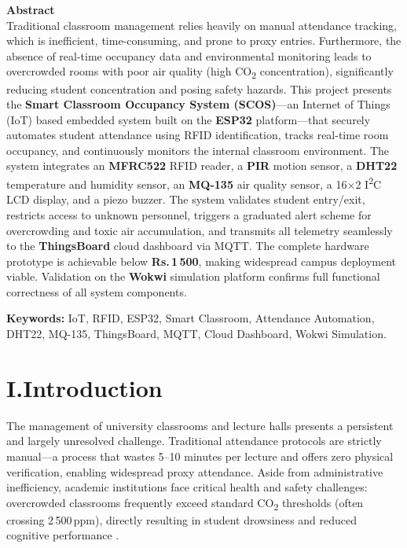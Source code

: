 \documentclass[12pt,a4paper]{article}
\begin{document}
\begin{mdframed}[linecolor=gray!60, backgroundcolor=gray!4]
\textbf{\large Abstract}\\[6pt]
Traditional classroom management relies heavily on manual attendance tracking, which is
inefficient, time-consuming, and prone to proxy entries. Furthermore, the absence of
real-time occupancy data and environmental monitoring leads to overcrowded rooms with
poor air quality (high CO\textsubscript{2} concentration), significantly reducing student concentration
and posing safety hazards. This project presents the \textbf{Smart Classroom Occupancy System
(SCOS)}---an Internet of Things (IoT) based embedded system built on the \textbf{ESP32} platform---that
securely automates student attendance using RFID identification, tracks real-time room
occupancy, and continuously monitors the internal classroom environment. The system
integrates an \textbf{MFRC522} RFID reader, a \textbf{PIR} motion sensor, a \textbf{DHT22} temperature and
humidity sensor, an \textbf{MQ-135} air quality sensor, a 16$\times$2 I\textsuperscript{2}C LCD display, and a piezo
buzzer. The system validates student entry/exit, restricts access to unknown personnel,
triggers a graduated alert scheme for overcrowding and toxic air accumulation, and
transmits all telemetry seamlessly to the \textbf{ThingsBoard} cloud dashboard via MQTT. The
complete hardware prototype is achievable below \textbf{Rs.\,1\,500}, making widespread campus
deployment viable. Validation on the \textbf{Wokwi} simulation platform confirms full functional
correctness of all system components.

\vspace{6pt}
\textbf{Keywords:} IoT, RFID, ESP32, Smart Classroom, Attendance Automation, DHT22,
MQ-135, ThingsBoard, MQTT, Cloud Dashboard, Wokwi Simulation.
\end{mdframed}

\newpage

\section*{I.\quad Introduction}

The management of university classrooms and lecture halls presents a persistent and
largely unresolved challenge. Traditional attendance protocols are strictly manual---a
process that wastes 5--10 minutes per lecture and offers zero physical verification,
enabling widespread proxy attendance. Aside from administrative inefficiency, academic
institutions face critical health and safety challenges: overcrowded classrooms frequently
exceed standard CO\textsubscript{2} thresholds (often crossing 2\,500\,ppm), directly resulting in student
drowsiness and reduced cognitive performance \cite{mcewen2013}.
\end{document}
